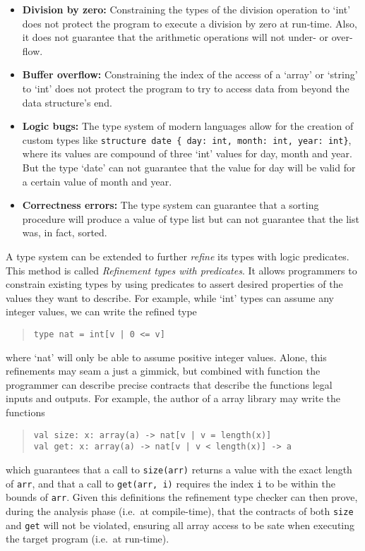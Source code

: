 \documentclass[
    oneside,
    english,
    embeddedlogo,
    noabntexcite
]{ufsc-thesis-rn46-2019}
\begin{document}
\begin{itemize}
    \item \textbf{Division by zero:} Constraining the types of the division operation to `int' does not protect the program to execute a division by zero at run-time.
          Also, it does not guarantee that the arithmetic operations will not under- or over-flow.
    \item \textbf{Buffer overflow:} Constraining the index of the access of a `array' or `string' to `int' does not protect the program to try to access data from beyond the data structure's end.
    \item \textbf{Logic bugs:} The type system of modern languages allow for the creation of custom types like \verb+structure date { day: int, month: int, year: int}+, where its values are compound of three `int' values for day, month and year.
          But the type `date' can not guarantee that the value for day will be valid for a certain value of month and year.
    \item \textbf{Correctness errors:} The type system can guarantee that a sorting procedure will produce a value of type list  but can not guarantee that the list was, in fact, sorted.
\end{itemize}

A type system can be extended to further \textit{refine} its types with logic predicates.
This method is called \textit{Refinement types with predicates}.
It allows programmers to constrain existing types by using predicates to assert desired properties of the values they want to describe.
For example, while `int' types can assume any integer values, we can write the refined type
\begin{quote}
    \begin{verbatim}
type nat = int[v | 0 <= v]
\end{verbatim}
\end{quote}
where `nat' will only be able to assume positive integer values.
Alone, this refinements may seam a just a gimmick, but combined with function the programmer can describe precise contracts that describe the functions legal inputs and outputs.
For example, the author of a array library may write the functions
\begin{quote}
    \begin{verbatim}
val size: x: array(a) -> nat[v | v = length(x)]
val get: x: array(a) -> nat[v | v < length(x)] -> a
\end{verbatim}
\end{quote}
which guarantees that a call to \verb+size(arr)+ returns a value with the exact length of \verb+arr+, and that a call to \verb+get(arr, i)+ requires the index \verb+i+ to be within the bounds of \verb+arr+.
Given this definitions the refinement type checker can then prove, during the analysis phase (i.e.\ at compile-time), that the contracts of both \verb+size+ and \verb+get+ will not be violated, ensuring all array access to be sate when executing the target program (i.e.\ at run-time).
\end{document}
